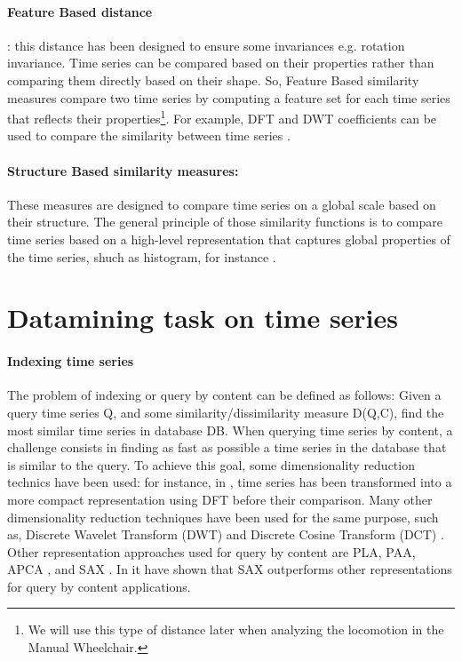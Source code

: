 \paragraph{Feature Based distance}: this distance has been designed to ensure some invariances e.g. rotation invariance. Time series can be compared based on their properties rather than comparing them directly based on their shape. So, Feature Based similarity measures compare two time series by computing a feature set for
each time series that reflects their properties\footnote{We will use this type of distance later when analyzing the locomotion in the Manual Wheelchair.}. For example, DFT and DWT coefficients can be used to compare the similarity between time series \cite{shatkay1996approximate}.


\paragraph{Structure Based similarity measures:}These measures are designed to compare time series on a global scale based on their structure. The general principle of those similarity functions is to compare time series based on a high-level representation that captures global properties of the time series, shuch as histogram, for instance  \cite{lin2009finding}.   



\section{Datamining task on time series}
\paragraph{Indexing time series}
The problem of indexing or query by content can be defined as follows: Given a query time series Q, and some similarity/dissimilarity measure D(Q,C), find the most similar time series in database DB. When querying time series by content, a challenge consists in finding as fast as possible a time series in the database that is similar to the query. To achieve this goal, some dimensionality reduction technics have been used:  for instance, in \cite{Agrawal1993}, time series has been transformed into a more compact representation using  DFT before their comparison. Many other dimensionality reduction techniques have been used for the same purpose, such as, Discrete Wavelet Transform (DWT) and Discrete Cosine Transform (DCT) \cite{chan1999efficient}. Other representation approaches used for query by content are PLA, PAA, APCA \cite{keogh2001locally}, and SAX \cite{Lin2007}. In \cite{Lin2007} it have shown that SAX outperforms other representations for query by content applications.

